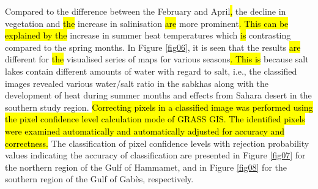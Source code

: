 \documentclass[land,article,submit,pdftex,moreauthors]{Definitions/mdpi}
\begin{document}
Compared to the difference between the February and April\hl{, }the decline in vegetation and \hl{the }increase in salinisation \hl{are} more prominent\hl{. This can be explained by the }increase in summer heat temperatures which \hl{is} contrasting compared to the spring months. In Figure \ref{fig06}, it is seen that the results \hl{are }different for \hl{the }visualised series of maps for various seasons\hl{. This is }because salt lakes contain different amounts of water with regard to salt, i.e., the classified images revealed various water/salt ratio in the sabkhas along with the development of heat during summer months and effects from Sahara desert in the southern study region. \hl{Correcting pixels in a classified image was performed using the pixel confidence level calculation mode of GRASS GIS. The identified pixels were examined automatically and automatically adjusted for accuracy and correctness. }The classification of pixel confidence levels with rejection probability values indicating the accuracy of classification are presented in Figure \ref{fig07} for the northern region of the Gulf of Hammamet, and in Figure \ref{fig08} for the southern region of the Gulf of Gabès, respectively.  
\end{document}
